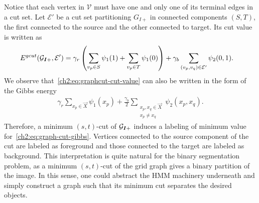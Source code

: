Notice that each vertex in $\mathcal{V}$ must have one and only one of its terminal edges in a cut set. Let $\mathcal{E}'$ be a cut set partitioning $G_{I+}$ in connected components $(S,T)$, the first connected to the source and the other connected to target. Its cut value is written as 
\begin{align}
	E^{gcut}(\mathcal{G}_{\bm{I}+},\mathcal{E}') &= \gamma_r \left( \sum_{v_p \in S}{ \psi_1(1) } +\sum_{v_p \in T}{\psi_1(0)} \right) + \gamma_b \sum_{(v_p,v_q) \in \mathcal{E}'}{\psi_2(0,1)}.
\label{ch2:eq:graphcut-cut-value}
\end{align}
%
We observe that~\cref{ch2:eq:graphcut-cut-value} can also be written in the form of the Gibbs energy
\begin{align}
	\gamma_r \sum_{x_p \in \vec{X}}{ \psi_1(x_p) } + \frac{\gamma_b}{2}\sum_{ \substack{x_p,x_q \in \vec{X} \\ x_p \neq x_q }}{\psi_2(x_p,x_q)}.
	\label{ch2:eq:graph-cut-gibbs}
\end{align}
%
%
Therefore, a minimum $(s,t)$-cut of $\mathcal{G}_{\bm{I}+}$ induces a labeling of minimum value for~\cref{ch2:eq:graph-cut-gibbs}. Vertices connected to the source component of the cut are labeled as foreground and those connected to the target are labeled as background. This interpretation is quite natural for the binary segmentation problem, as a minimum $(s,t)$-cut of the grid graph gives a binary partition of the image. In this sense, one could abstract the HMM machinery underneath and simply construct a graph such that its minimum cut separates the desired objects.


